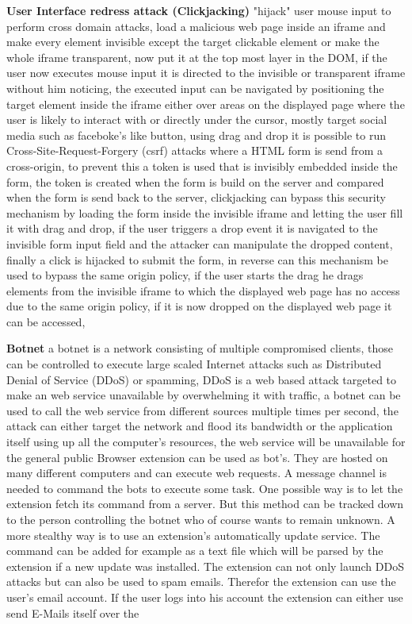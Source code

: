 \documentclass[article,colorback,accentcolor=tud9c,type=bsc]{tudthesis}
\begin{document}
	\textbf{User Interface redress attack (Clickjacking)} \cite{paulstone_clickjacking} "hijack" user mouse input to perform cross domain attacks, load a malicious web page inside an iframe and make every element invisible except the target clickable element or make the whole iframe transparent, now put it at the top most layer in the DOM, if the user now executes mouse input it is directed to the invisible or transparent iframe without him noticing, the executed input can be navigated by positioning the target element inside the iframe either over areas on the displayed page where the user is likely to interact with or directly under the cursor, mostly target social media such as faceboke's like button, using drag and drop it is possible to run Cross-Site-Request-Forgery (csrf) attacks where a HTML form is send from a cross-origin, to prevent this a token is used that is invisibly embedded inside the form, the token is created when the form is build on the server and compared when the form is send back to the server, clickjacking can bypass this security mechanism by loading the form inside the invisible iframe and letting the user fill it with drag and drop, if the user triggers a drop event it is navigated to the invisible form input field and the attacker can manipulate the dropped content, finally a click is hijacked to submit the form, in reverse can this mechanism be used to bypass the same origin policy, if the user starts the drag he drags elements from the invisible iframe to which the displayed web page has no access due to the same origin policy, if it is now dropped on the displayed web page it can be accessed,
	
	\textbf{Botnet} a botnet is a network consisting of multiple compromised clients, those can be controlled to execute large scaled Internet attacks such as Distributed Denial of Service (DDoS) or spamming, DDoS is a web based attack targeted to make an web service unavailable by overwhelming it with traffic, a botnet can be used to call the web service from different sources multiple times per second, the attack can either target the network and flood its bandwidth or the application itself using up all the computer's resources, the web service will be unavailable for the general public \cite{liu2011botnet}
	Browser extension can be used as bot's. They are hosted on many different computers and can execute web requests. A message channel is needed to command the bots to execute some task. One possible way is to let the extension fetch its command from a server. But this method can be tracked down to the person controlling the botnet who of course wants to remain unknown. A more stealthy way is to use an extension's automatically update service. The command can be added for example as a text file which will be parsed by the extension if a new update was installed. The extension can not only launch DDoS attacks but can also be used to spam emails. Therefor the extension can use the user's email account. If the user logs into his account the extension can either use send E-Mails itself over the 
	
\end{document}
